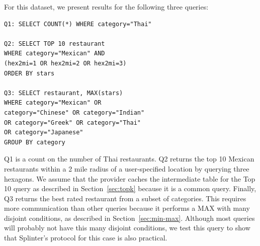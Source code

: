 

For this dataset, we present results for the following three queries:
\begin{verbatim}
Q1: SELECT COUNT(*) WHERE category="Thai"

Q2: SELECT TOP 10 restaurant
WHERE category="Mexican" AND
(hex2mi=1 OR hex2mi=2 OR hex2mi=3)
ORDER BY stars

Q3: SELECT restaurant, MAX(stars) 
WHERE category="Mexican" OR
category="Chinese" OR category="Indian"
OR category="Greek" OR category="Thai"
OR category="Japanese"
GROUP BY category
\end{verbatim}

Q1 is a count on the number of Thai restaurants.
Q2 returns the top 10 Mexican restaurants within
a 2 mile radius of a user-specified location by querying three hexagons.
We assume that the provider caches the intermediate table for the 
Top 10 query as described in Section~\ref{sec:topk} because it is a common query.
Finally, Q3 returns the best rated restaurant from
a subset of categories.
This requires more communication than other queries because 
it performs a MAX with many disjoint conditions, 
as described in Section~\ref{sec:min-max}. Although most queries will probably
not have this many disjoint conditions, we test this query to show
that Splinter's protocol for this case is also practical.


